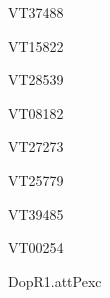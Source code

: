 \documentclass[17pt]{extarticle}
\begin{document}
\footnotesize
\vspace*{\fill}
\newpage{}
\vspace*{\fill}\begin{large}
VT37488 \\[0.5em]
\end{large}
\footnotesize
\vspace*{\fill}
\newpage{}
\vspace*{\fill}\begin{large}
VT15822 \\[0.5em]
\end{large}
\footnotesize
\vspace*{\fill}
\newpage{}
\vspace*{\fill}\begin{large}
VT28539 \\[0.5em]
\end{large}
\footnotesize
\vspace*{\fill}
\newpage{}
\vspace*{\fill}\begin{large}
VT08182 \\[0.5em]
\end{large}
\footnotesize
\vspace*{\fill}
\newpage{}
\vspace*{\fill}\begin{large}
VT27273 \\[0.5em]
\end{large}
\footnotesize
\vspace*{\fill}
\newpage{}
\vspace*{\fill}\begin{large}
VT25779 \\[0.5em]
\end{large}
\footnotesize
\vspace*{\fill}
\newpage{}
\vspace*{\fill}\begin{large}
VT39485 \\[0.5em]
\end{large}
\footnotesize
\vspace*{\fill}
\newpage{}
\vspace*{\fill}\begin{large}
VT00254 \\[0.5em]
\end{large}
\footnotesize
\vspace*{\fill}
\newpage{}
\vspace*{\fill}\begin{normalsize}
DopR1.attPexc \\[0.5em]
\end{normalsize}
\end{document}
